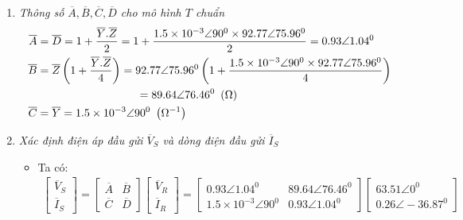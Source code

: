 \begin{enumerate}
\begin{enumerate}[ \it a.]
				\item \emph{Thông số $\overline{A}, \overline{B}, \overline{C}, \overline{D}$ cho mô hình $T$ chuẩn}				
					\begin{align*}
						\overline{A} 	& = \overline{D}  = 1 + \dfrac{\overline{Y}.\overline{Z}}{2} = 1 + \dfrac{1.5 \times 10^{-3} \angle 90^0 \times 92.77 \angle 75.96^0}{2} = 0.93 \angle 1.04^0\\
						 \overline{B} & = \overline{Z} \pfm{1+\dfrac{\overline{Y}.\overline{Z}}{4}}=92.77 \angle 75.96^0  \pfm{1 + \dfrac{1.5 \times 10^{-3} \angle 90^0 \times 92.77 \angle 75.96^0}{4}} \\ 
						 & \hspace{3.15cm}= 89.64 \angle 76.46^0 \unitp{\Omega}\\
						 \overline{C} & = \overline{Y} = 1.5 \times 10^{-3} \angle 90^0 \unitp{\Omega^{-1}}
					\end{align*}				
				
				\item \emph{Xác định điện áp đầu gửi $\overline{V}_S$ và dòng điện đầu gửi $\overline{I}_S$}
					\begin{itemize}
						\item Ta có: 
							\begin{align*}
								\left[{\begin{array}{c}
								\overline{V}_S\\
								\overline{I}_S
								\end{array}
								}\right]
								= 
								\left[{\begin{array}{cc}
								\overline{A} & \overline{B}\\
								\overline{C} & \overline{D}
								\end{array}
								}\right]				
							\left[{\begin{array}{c}
							\overline{V}_R\\
							\overline{I}_R
							\end{array}
							}\right]
							= \left[{\begin{array}{cc}
								 0.93 \angle 1.04^0 & 89.64 \angle 76.46^0\\
								1.5 \times 10^{-3} \angle 90^0 &  0.93 \angle 1.04^0
								\end{array}
								}\right]				
							\left[{\begin{array}{c}
							63.51 \angle 0^0\\
							0.26 \angle -36.87^0
							\end{array}
							}\right]
						\end{align*}
						

\end{itemize}
\end{enumerate}
\end{enumerate}
